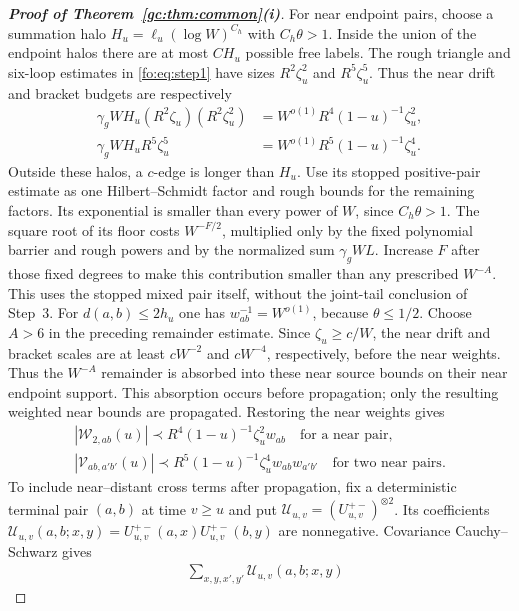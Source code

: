 \documentclass[11pt]{article}
\numberwithin{equation}{section}
\theoremstyle{remark}
\begin{document}
\begin{proof}[\textbf{Proof of Theorem~\ref{gc:thm:common}(i)}]
For near endpoint pairs, choose a summation halo
$H_u=\ell_u(\log W)^{C_h}$ with $C_h\theta>1$.
Inside the union of the endpoint halos there are at most $CH_u$
possible free labels. The rough triangle and six-loop estimates in
\eqref{fo:eq:step1} have sizes $R^2\zeta_u^2$ and $R^5\zeta_u^5$.
Thus the near drift and bracket budgets are respectively
\[
 \begin{aligned}
 \gamma_gW H_u(R^2\zeta_u)(R^2\zeta_u^2)
   &=W^{o(1)}R^4(1-u)^{-1}\zeta_u^2,\\
 \gamma_gW H_uR^5\zeta_u^5
   &=W^{o(1)}R^5(1-u)^{-1}\zeta_u^4.
 \end{aligned}
\]
Outside these halos, a $c$-edge is longer than $H_u$. Use its stopped
positive-pair estimate as one Hilbert--Schmidt factor and rough bounds
for the remaining factors. Its exponential is smaller than every
power of $W$, since $C_h\theta>1$. The square root of its floor costs
$W^{-F/2}$, multiplied only by the fixed polynomial barrier and rough
powers and by the normalized sum $\gamma_gWL$. Increase $F$ after
those fixed degrees to make this contribution smaller than any
prescribed $W^{-A}$. This uses the stopped mixed pair itself, without
the joint-tail conclusion of Step~3.
For $d(a,b)\le2h_u$ one has $w_{ab}^{-1}=W^{o(1)}$, because
$\theta\le1/2$. Choose $A>6$ in the preceding remainder estimate.
Since $\zeta_u\ge c/W$, the near drift and bracket scales are at
least $cW^{-2}$ and $cW^{-4}$, respectively, before the near weights.
Thus the $W^{-A}$ remainder is absorbed into these near source bounds
on their near endpoint support. This absorption occurs before
propagation; only the resulting weighted near bounds are propagated.
Restoring the near weights gives
\begin{equation}\label{fo:eq:pair-near-sources}
 \begin{gathered}
 |\mathcal W_{2,ab}(u)|\prec R^4(1-u)^{-1}\zeta_u^2w_{ab}
       \quad\text{for a near pair},\\
 |\mathcal V_{ab,a'b'}(u)|\prec
       R^5(1-u)^{-1}\zeta_u^4w_{ab}w_{a'b'}
       \quad\text{for two near pairs}.
 \end{gathered}
\end{equation}
To include near--distant cross terms after propagation, fix a deterministic
terminal pair $(a,b)$ at time $v\ge u$ and put
$\mathcal U_{u,v}=(U_{u,v}^{+-})^{\otimes2}$. Its coefficients
$\mathcal U_{u,v}(a,b;x,y)=U_{u,v}^{+-}(a,x)U_{u,v}^{+-}(b,y)$
are nonnegative. Covariance Cauchy--Schwarz gives
\[
 \begin{aligned}
 &\sum_{x,y,x',y'}\mathcal U_{u,v}(a,b;x,y)

\end{aligned}\]
\end{proof}
\end{document}
